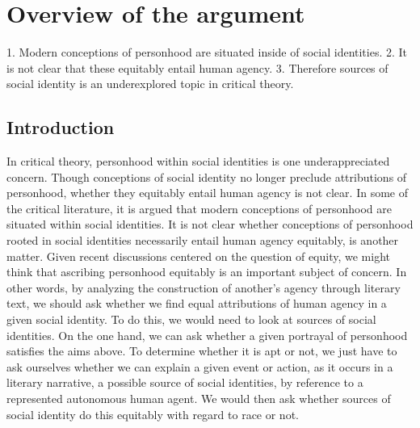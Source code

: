 \documentclass[
  12pt,
]{book}
\newenvironment{Shaded}{\begin{snugshade}}{\end{snugshade}}
\newcommand{\NormalTok}[1]{#1}
\theoremstyle{definition}
\theoremstyle{definition}
\theoremstyle{definition}
\theoremstyle{definition}
\theoremstyle{remark}
\begin{document}
\section{Overview of the argument}\label{overview-of-the-argument}

\begin{Shaded}
\begin{Highlighting}[]

\NormalTok{1. Modern conceptions of personhood are situated inside of social identities.}
\NormalTok{2. It is not clear that these equitably entail human agency.}
\NormalTok{3. Therefore sources of social identity is an underexplored topic in critical theory.}
\end{Highlighting}
\end{Shaded}

\subsection{Introduction}\label{introduction-1}

In critical theory, personhood within social identities is one underappreciated concern. Though conceptions of social identity no longer preclude attributions of personhood, whether they equitably entail human agency is not clear. In some of the critical literature, it is argued that modern conceptions of personhood are situated within social identities. It is not clear whether conceptions of personhood rooted in social identities necessarily entail human agency equitably, is another matter. Given recent discussions centered on the question of equity, we might think that ascribing personhood equitably is an important subject of concern. In other words, by analyzing the construction of another's agency through literary text, we should ask whether we find equal attributions of human agency in a given social identity. To do this, we would need to look at sources of social identities. On the one hand, we can ask whether a given portrayal of personhood satisfies the aims above. To determine whether it is apt or not, we just have to ask ourselves whether we can explain a given event or action, as it occurs in a literary narrative, a possible source of social identities, by reference to a represented autonomous human agent. We would then ask whether sources of social identity do this equitably with regard to race or not.
\end{document}
